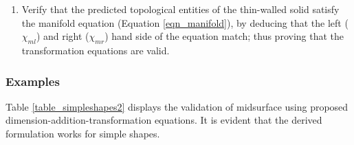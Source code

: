 \begin{enumerate}
\item Verify that the predicted topological entities of the  thin-walled solid satisfy the manifold equation (Equation \ref{eqn_manifold}), by deducing that the left ($\chi_{ml}$) and right  ($\chi_{mr}$) hand side of the equation match; thus proving that the transformation equations are valid. 
\end{enumerate}



\subsubsection{Examples}
Table \ref{table_simpleshapes2} displays the validation of midsurface using proposed dimension-addition-transformation equations. It is evident that the derived formulation works for simple shapes. 

